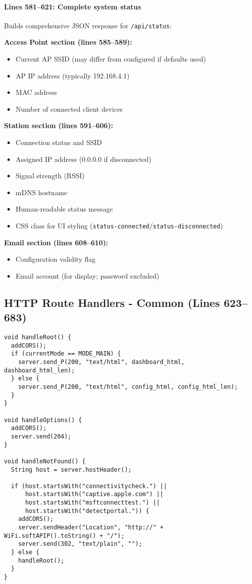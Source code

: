 \documentclass[11pt,a4paper]{article}
\begin{document}
\paragraph{Lines 581--621: Complete system status}
Builds comprehensive JSON response for \texttt{/api/status}:

\textbf{Access Point section (lines 585--589):}
\begin{itemize}[leftmargin=*]
  \item Current AP SSID (may differ from configured if defaults used)
  \item AP IP address (typically 192.168.4.1)
  \item MAC address
  \item Number of connected client devices
\end{itemize}

\textbf{Station section (lines 591--606):}
\begin{itemize}[leftmargin=*]
  \item Connection status and SSID
  \item Assigned IP address (0.0.0.0 if disconnected)
  \item Signal strength (RSSI)
  \item mDNS hostname
  \item Human-readable status message
  \item CSS class for UI styling (\texttt{status-connected}/\texttt{status-disconnected})
\end{itemize}

\textbf{Email section (lines 608--610):}
\begin{itemize}[leftmargin=*]
  \item Configuration validity flag
  \item Email account (for display; password excluded)
\end{itemize}

\subsection{HTTP Route Handlers - Common (Lines 623--683)}

\begin{verbatim}
void handleRoot() {
  addCORS();
  if (currentMode == MODE_MAIN) {
    server.send_P(200, "text/html", dashboard_html, dashboard_html_len);
  } else {
    server.send_P(200, "text/html", config_html, config_html_len);
  }
}

void handleOptions() {
  addCORS();
  server.send(204);
}

void handleNotFound() {
  String host = server.hostHeader();
  
  if (host.startsWith("connectivitycheck.") || 
      host.startsWith("captive.apple.com") ||
      host.startsWith("msftconnecttest.") || 
      host.startsWith("detectportal.")) {
    addCORS();
    server.sendHeader("Location", "http://" + WiFi.softAPIP().toString() + "/");
    server.send(302, "text/plain", "");
  } else {
    handleRoot();
  }
}
\end{verbatim}
\end{document}

